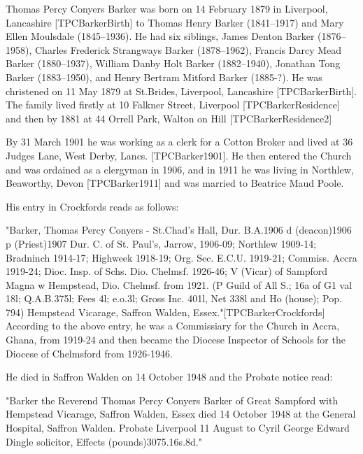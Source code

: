
 Thomas Percy Conyers Barker was born on 14 February 1879 in Liverpool, Lancashire [TPCBarkerBirth] to Thomas Henry Barker (1841--1917) and
Mary Ellen Moulsdale (1845--1936).  He had six siblings, James Denton Barker (1876--1958), Charles Frederick Strangways Barker (1878--1962),  Francis Darcy Mead Barker (1880--1937), William Danby Holt Barker (1882--1940),
Jonathan Tong Barker (1883--1950), and Henry Bertram Mitford Barker (1885-?).
He was christened on 11 May 1879 at St.Brides, Liverpool, Lancashire [TPCBarkerBirth]. The family lived firstly at 10 Falkner Street, Liverpool [TPCBarkerResidence] and then by 1881 at 44 Orrell Park, Walton on Hill [TPCBarkerResidence2]

By 31 March 1901 he was working as a clerk for a Cotton Broker and lived at 36 Judges Lane, West Derby, Lancs. [TPCBarker1901].  He then entered the Church and was ordained as a clergyman in 1906, and in 1911 he  was living in Northlew, Beaworthy, Devon [TPCBarker1911] and was married to Beatrice Maud Poole.

His entry in Crockfords reads as follows:

"Barker, Thomas Percy Conyers - St.Chad's Hall, Dur. B.A.1906 d (deacon)1906 p (Priest)1907 Dur. C. of St. Paul's, Jarrow, 1906-09; Northlew 1909-14; Bradninch 1914-17; Highweek 1918-19; Org. Sec. E.C.U. 1919-21; Commiss. Accra 1919-24; Dioc. Insp. of Schs. Dio. Chelmsf. 1926-46; V (Vicar) of Sampford Magna w Hempstead, Dio. Chelmsf. from 1921. (P Guild of All S.; 16a of G1 val 18l; Q.A.B.375l; Fees 4l; e.o.3l; Gross Inc. 401l, Net 338l and Ho (house); Pop. 794) Hempstead Vicarage, Saffron Walden, Essex."[TPCBarkerCrockfords]
According to the above entry, he was a Commissiary for the Church in Accra, Ghana, from 1919-24 and then became the Diocese Inspector of Schools for the Diocese of Chelmsford from 1926-1946.  

He died in Saffron Walden on 14 October 1948 and the Probate notice read:

"Barker the Reverend Thomas Percy Conyers Barker of Great Sampford with Hempstead Vicarage, Saffron Walden, Essex died 14 October 1948 at the General Hospital, Saffron Walden. Probate Liverpool 11 August to Cyril George Edward Dingle solicitor, Effects (pounds)3075.16s.8d." 

